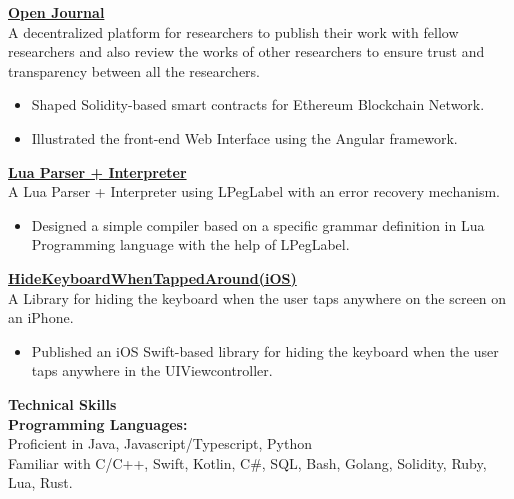\documentclass{article}
\begin{document}
\noindent \normalsize \href{https://github.com/kdpisda/scientific-journal-blockchain}{\textbf{Open Journal}} \\
\noindent \normalsize A decentralized platform for researchers to publish their work with fellow researchers and also review the works of other researchers to ensure trust and transparency between all the researchers.
\begin{itemize}
    \item Shaped Solidity-based smart contracts for Ethereum Blockchain Network.
    \item Illustrated the front-end Web Interface using the Angular framework.
\end{itemize}
\vspace{3pt}

\noindent \normalsize \href{https://gist.github.com/0a9d7b1a040249d1b525ab94198a42ac}{\textbf{Lua Parser + Interpreter}} \\
\noindent \normalsize A Lua Parser + Interpreter using LPegLabel with an error recovery mechanism.
\begin{itemize}
    \item Designed a simple compiler based on a specific grammar definition in Lua Programming language with the help of LPegLabel.
\end{itemize}
\vspace{3pt}

\noindent \normalsize \href{https://bit.ly/3a62RB4}{\textbf{HideKeyboardWhenTappedAround(iOS)}} \\
\noindent \normalsize A Library for hiding the keyboard when the user taps anywhere on the screen on an iPhone.
\begin{itemize}
    \item Published an iOS Swift-based library for hiding the keyboard when the user taps anywhere in the UIViewcontroller.
\end{itemize}
\vspace{3pt}

\noindent \large \textbf{\textcolor{NavyBlue}{Technical Skills}} \vspace{3pt} \\
\noindent \normalsize \textbf{Programming Languages:} \\
\noindent \normalsize Proficient in Java, Javascript/Typescript, Python \\
\noindent \normalsize Familiar with C/C++, Swift, Kotlin, C\#, SQL, Bash, Golang, Solidity, Ruby, Lua, Rust.
\vspace{3pt}
\end{document}
